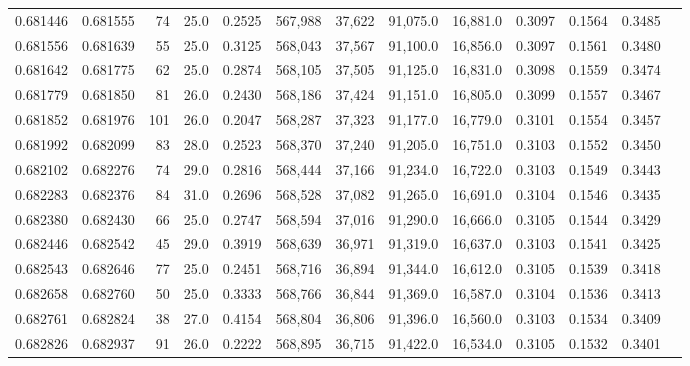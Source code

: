 \begin{tabular}{rrrrrrrrrrrrr}
0.681446 & 0.681555 &    74 & 25.0 &                                     0.2525 & 567,988 &  37,622 &  91,075.0 &  16,881.0 & 0.3097 & 0.1564 & 0.3485 \\
0.681556 & 0.681639 &    55 & 25.0 &                                     0.3125 & 568,043 &  37,567 &  91,100.0 &  16,856.0 & 0.3097 & 0.1561 & 0.3480 \\
0.681642 & 0.681775 &    62 & 25.0 &                                     0.2874 & 568,105 &  37,505 &  91,125.0 &  16,831.0 & 0.3098 & 0.1559 & 0.3474 \\
0.681779 & 0.681850 &    81 & 26.0 &                                     0.2430 & 568,186 &  37,424 &  91,151.0 &  16,805.0 & 0.3099 & 0.1557 & 0.3467 \\
0.681852 & 0.681976 &   101 & 26.0 &                                     0.2047 & 568,287 &  37,323 &  91,177.0 &  16,779.0 & 0.3101 & 0.1554 & 0.3457 \\
0.681992 & 0.682099 &    83 & 28.0 &                                     0.2523 & 568,370 &  37,240 &  91,205.0 &  16,751.0 & 0.3103 & 0.1552 & 0.3450 \\
0.682102 & 0.682276 &    74 & 29.0 &                                     0.2816 & 568,444 &  37,166 &  91,234.0 &  16,722.0 & 0.3103 & 0.1549 & 0.3443 \\
0.682283 & 0.682376 &    84 & 31.0 &                                     0.2696 & 568,528 &  37,082 &  91,265.0 &  16,691.0 & 0.3104 & 0.1546 & 0.3435 \\
0.682380 & 0.682430 &    66 & 25.0 &                                     0.2747 & 568,594 &  37,016 &  91,290.0 &  16,666.0 & 0.3105 & 0.1544 & 0.3429 \\
0.682446 & 0.682542 &    45 & 29.0 &                                     0.3919 & 568,639 &  36,971 &  91,319.0 &  16,637.0 & 0.3103 & 0.1541 & 0.3425 \\
0.682543 & 0.682646 &    77 & 25.0 &                                     0.2451 & 568,716 &  36,894 &  91,344.0 &  16,612.0 & 0.3105 & 0.1539 & 0.3418 \\
0.682658 & 0.682760 &    50 & 25.0 &                                     0.3333 & 568,766 &  36,844 &  91,369.0 &  16,587.0 & 0.3104 & 0.1536 & 0.3413 \\
0.682761 & 0.682824 &    38 & 27.0 &                                     0.4154 & 568,804 &  36,806 &  91,396.0 &  16,560.0 & 0.3103 & 0.1534 & 0.3409 \\
0.682826 & 0.682937 &    91 & 26.0 &                                     0.2222 & 568,895 &  36,715 &  91,422.0 &  16,534.0 & 0.3105 & 0.1532 & 0.3401 \\

\end{tabular}
